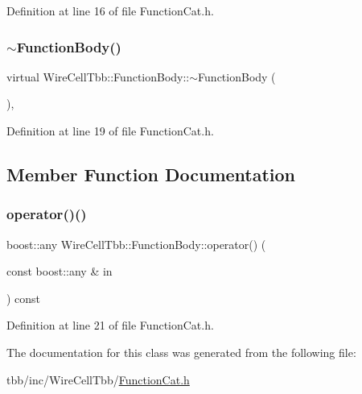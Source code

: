 Definition at line 16 of file Function\+Cat.\+h.

\mbox{\label{class_wire_cell_tbb_1_1_function_body_a9ac1d28cd025798a442540cab57267a6}} 
\subsubsection{\texorpdfstring{$\sim$\+Function\+Body()}{~FunctionBody()}}
{\footnotesize\ttfamily virtual Wire\+Cell\+Tbb\+::\+Function\+Body\+::$\sim$\+Function\+Body (\begin{DoxyParamCaption}{ }\end{DoxyParamCaption})\hspace{0.3cm}{\ttfamily [inline]}, {\ttfamily [virtual]}}



Definition at line 19 of file Function\+Cat.\+h.



\subsection{Member Function Documentation}
\mbox{\label{class_wire_cell_tbb_1_1_function_body_a56c143656aa5a45ec3ddfdd7e4ae065d}} 
\subsubsection{\texorpdfstring{operator()()}{operator()()}}
{\footnotesize\ttfamily boost\+::any Wire\+Cell\+Tbb\+::\+Function\+Body\+::operator() (\begin{DoxyParamCaption}\item[{const boost\+::any \&}]{in }\end{DoxyParamCaption}) const\hspace{0.3cm}{\ttfamily [inline]}}



Definition at line 21 of file Function\+Cat.\+h.



The documentation for this class was generated from the following file\+:\begin{DoxyCompactItemize}
\item 
tbb/inc/\+Wire\+Cell\+Tbb/\hyperlink{_function_cat_8h}{Function\+Cat.\+h}\end{DoxyCompactItemize}
